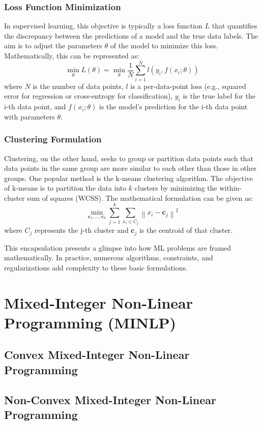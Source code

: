 \subsubsection*{Loss Function Minimization}

In supervised learning, this objective is typically a loss function \( L \) that quantifies the discrepancy between the predictions of a model and the true data labels. The aim is to adjust the parameters \( \theta \) of the model to minimize this loss. Mathematically, this can be represented as:
\begin{equation}
\min_{\theta} L(\theta) = \min_{\theta} \frac{1}{N} \sum_{i=1}^{N} l(y_i, f(x_i; \theta))
\end{equation}
where \( N \) is the number of data points, \( l \) is a per-data-point loss (e.g., squared error for regression or cross-entropy for classification), \( y_i \) is the true label for the i-th data point, and \( f(x_i; \theta) \) is the model's prediction for the i-th data point with parameters \( \theta \).

\subsubsection*{Clustering Formulation}

Clustering, on the other hand, seeks to group or partition data points such that data points in the same group are more similar to each other than those in other groups. One popular method is the k-means clustering algorithm. The objective of k-means is to partition the data into \( k \) clusters by minimizing the within-cluster sum of squares (WCSS). The mathematical formulation can be given as:
\begin{equation}
\min_{\mathbf{c}_1, \ldots, \mathbf{c}_k} \sum_{j=1}^{k} \sum_{x_i \in C_j} \left\| x_i - \mathbf{c}_j \right\|^2
\end{equation}
where \( C_j \) represents the j-th cluster and \( \mathbf{c}_j \) is the centroid of that cluster.

This encapsulation presents a glimpse into how ML problems are framed mathematically. In practice, numerous algorithms, constraints, and regularizations add complexity to these basic formulations.


\section{Mixed-Integer Non-Linear Programming (MINLP)}
\subsection{Convex Mixed-Integer Non-Linear Programming}




\subsection{Non-Convex Mixed-Integer Non-Linear Programming}





%
%
%
